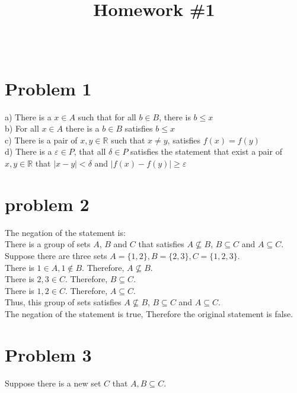 \documentclass{article}
\begin{document}
\title{\textbf{Homework \#1 }}
\date{\ }
\maketitle

\section*{Problem 1}
    
    a) There is a \(x\in A\) such that for all \(b \in B\), there is \(b \le x\)\\
    b) For all \(x \in A\) there is a \(b\in B\) satisfies \(b \le x\)\\
    c) There is a pair of \(x,y \in \mathbb{R}\) such that \(x\neq y\), satisfies \(f(x)=f(y)\)\\
    d) There is a \(\varepsilon \in P\), that all \(\delta \in P\) satisfies the
    statement that exist a pair of \(x,y \in \mathbb{R}\) that \(|x-y| < \delta\) and \(|f(x)-f(y)|\geq \varepsilon\)
\section*{problem 2}
    The negation of the statement is: \\
    There is a group of sets \(A\), \(B\) and \(C\) that satisfies \(A\nsubseteq B\), \(B \subseteq C\) and \(A \subseteq C\).
    Suppose there are three sets \(A=\{1,2\}, B=\{2,3\},C=\{1,2,3\}\). \\ 
    There is \(1 \in A, 1\notin B\). Therefore, \(A \nsubseteq B\).\\
    There is \(2,3 \in C\). Therefore, \(B \subseteq C\).\\
    There is \(1,2 \in C\). Therefore, \(A \subseteq C\).\\
    Thus, this group of sets satisfies \(A\nsubseteq B\), \(B \subseteq C\) and \(A \subseteq C\).\\
    The negation of the statement is true, Therefore the original statement is false.
\section*{Problem 3}
    Suppose there is a new set \(C\) that \(A,B \subseteq C\). 
    
\end{document}
